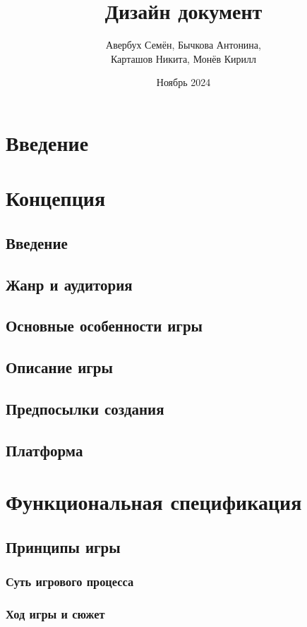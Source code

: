 \documentclass{article}
\title{Дизайн документ}
\author{Авербух Семён, Бычкова Антонина, \\ Карташов Никита, Монёв Кирилл}
\date{Ноябрь 2024}
\begin{document}
\maketitle

\tableofcontents

\section{Введение}

\section{Концепция}
    \subsection{Введение}
    \subsection{Жанр и аудитория}
    \subsection{Основные особенности игры}
    \subsection{Описание игры}
    \subsection{Предпосылки создания}
    \subsection{Платформа}

\section{Функциональная спецификация}
    \subsection{Принципы игры}
        \subsubsection{Суть игрового процесса}
        \subsubsection{Ход игры и сюжет}
\end{document}
